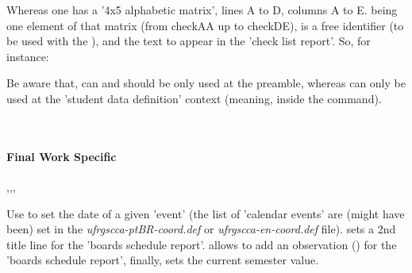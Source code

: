 \documentclass[dctools,english,tocdepth=3,secdepth=3]{ufrgscca} %
\begin{document}
\begin{Macros}{\checkdef}%
\begin{Syntax}%
\end{Syntax}
Whereas one has a '4x5 alphabetic matrix', lines A to D, columns A to E.  being one element of that matrix (from checkAA up to checkDE),  is a free identifier (to be used with the \Macro{\checklist}{}), and  the text to appear in the 'check list report'.  So, for instance:

\begin{stcode}[st=d.check]


\end{stcode}



Be aware that, \Macro{\checkdef}{} can and should be only used at the preamble, whereas \Macro{\checklist}{} can only be used at the 'student data definition' context (meaning, inside the \Macro{\NewStudent}{} command).
\end{Macros}\\

\paragraph{Final Work Specific}

\begin{Macros}{\tcccalendareventdate,\boardstitleB,\boardsOBS,\TCCperiod}
	\begin{Syntax}%
	\end{Syntax}
Use \Macro{\tcccalendareventdate}{} to set the date of a given 'event' (the list of 'calendar events' are (might have been) set in the \emph{ufrgscca-ptBR-coord.def} or \emph{ufrgscca-en-coord.def} file).  sets a 2nd title line for the 'boards schedule report'. \Macro{\boardsOBS}{} allows to add an observation () for the 'boards schedule report', finally, \Macro{\TCCperiod} sets the current semester value.
\end{Macros}
\end{document}
